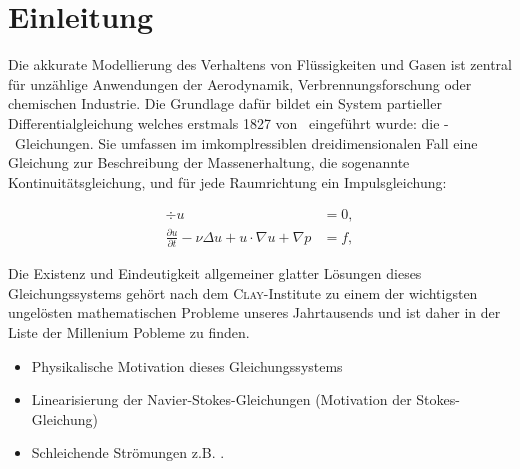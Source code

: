 \chapter*{Einleitung}

Die akkurate Modellierung des Verhaltens von Flüssigkeiten und Gasen ist zentral für unzählige Anwendungen der Aerodynamik, Verbrennungsforschung oder chemischen Industrie.
Die Grundlage dafür bildet ein System partieller Differentialgleichung welches erstmals 1827 von \navier\ eingeführt wurde: die \navier\hyp{}\stokes\ Gleichungen. 
Sie umfassen im imkomplressiblen dreidimensionalen Fall eine Gleichung zur Beschreibung der Massenerhaltung, die sogenannte Kontinuitätsgleichung, und für jede Raumrichtung ein Impulsgleichung:

\begin{align*}
  \div u &= 0, \\
  \frac{\partial u}{\partial t} - \nu \Delta u + u \cdot \nabla u + \nabla p &= f,
\end{align*}

Die Existenz und Eindeutigkeit allgemeiner glatter Lösungen dieses Gleichungssystems gehört nach dem \textsc{Clay}\hyp{}Institute zu einem der wichtigsten ungelösten mathematischen Probleme unseres Jahrtausends und ist daher in der Liste der Millenium Pobleme zu finden.




\begin{itemize}
  \item Physikalische Motivation dieses Gleichungssystems
  \item Linearisierung der Navier-Stokes-Gleichungen (Motivation der Stokes-Gleichung)
  \item Schleichende Strömungen z.B. \cite[S.112,S.489]{spurk10stroemungslehre}. 
\end{itemize}

